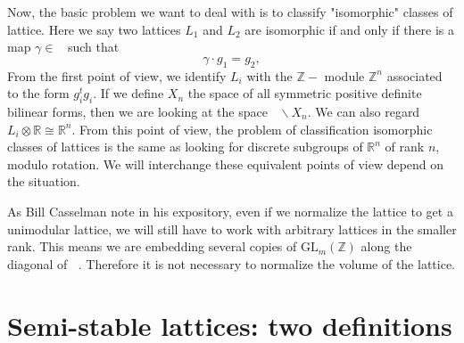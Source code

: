 \documentclass[12pt]{article} %
\DeclareMathOperator{\slnz}{SL_n(\mathbb{Z})}
\DeclareMathOperator{\glnz}{GL_n(\mathbb{Z})}
\begin{document}
Now, the basic problem we want to deal with is to classify "isomorphic" classes of lattice. Here
we say two lattices $L_1$ and $L_2$ are isomorphic if and only if there is a map $\gamma \in \glnz$ such that
\[\gamma \cdot g_1 = g_2,\]
From the first point of view, we identify $L_i$ with the $\mathbb{Z}-$ module
$\mathbb{Z}^n$ associated to the form $g_i^tg_i$. If we define $X_n$ the space of all
symmetric positive definite bilinear forms, then we are looking at the space $\glnz \backslash X_n$. We can also
regard $L_i \otimes \mathbb{R} \cong \mathbb{R}^n$. From this point of view,
the problem of classification isomorphic classes of lattices is the same as looking for discrete
subgroups of $\mathbb{R}^n$ of rank $n$, modulo rotation. We will interchange these equivalent points of view
depend on the situation.

As Bill Casselman note in his expository, even if we normalize the lattice to get a unimodular
lattice, we will still have to work with arbitrary lattices in the smaller rank. This means we are embedding
several copies of $\text{GL}_m(\mathbb{Z})$ along the diagonal of $\slnz$. Therefore it is not necessary to
normalize the volume of the lattice.
\section{Semi-stable lattices: two definitions}
\end{document}
